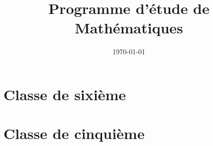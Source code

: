 

\newcommand{\savoirfaire}{\texttt{[image: SavoirFaire.pdf]}}
\newcommand{\savoir}{\texttt{[image: Savoir.pdf]}}
\newcommand{\ressource}[1]{\texttt{[image: \#1]}}

\title {\Huge\bf Programme d'étude de Mathématiques}
\author { }
\date {\today}

\makeindex




\sf



\maketitle
\dominitoc
\tableofcontents

\renewcommand{\labelitemi}{\Pisymbol{pzd}{219}}
\renewcommand{\labelitemii}{\Pisymbol{pzd}{85}}
\renewcommand{\labelitemiii}{\Pisymbol{pzd}{98}}




\part*{Classe de sixième}

\setcounter{chapter}{0}
\renewcommand{\chaptername}{Module}






\part*{Classe de cinquième}







